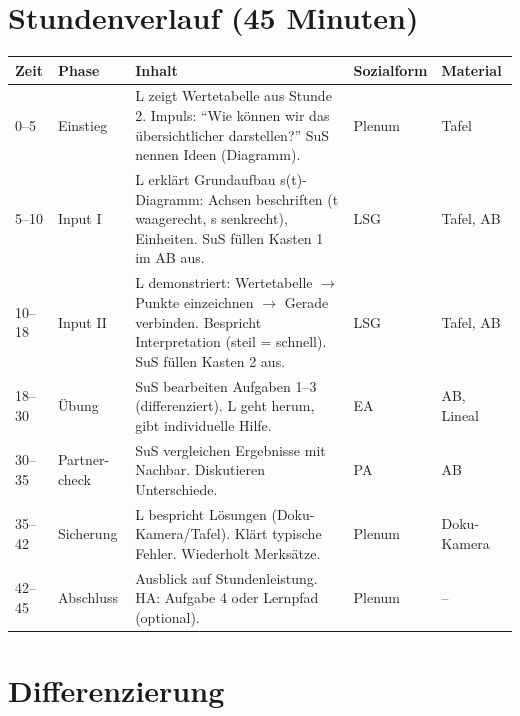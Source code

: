 \documentclass[11pt,a4paper]{article}
\begin{document}
\section*{Stundenverlauf (45 Minuten)}

\begin{longtable}{|p{1cm}|p{1.5cm}|p{6cm}|p{2.5cm}|p{2cm}|}
\hline
\textbf{Zeit} & \textbf{Phase} & \textbf{Inhalt} & \textbf{Sozialform} & \textbf{Material} \\
\hline
\endhead

0--5 & Einstieg & L zeigt Wertetabelle aus Stunde 2. Impuls: ``Wie können wir das übersichtlicher darstellen?'' SuS nennen Ideen (Diagramm). & Plenum & Tafel \\
\hline

5--10 & Input I & L erklärt Grundaufbau s(t)-Diagramm: Achsen beschriften (t waagerecht, s senkrecht), Einheiten. SuS füllen Kasten 1 im AB aus. & LSG & Tafel, AB \\
\hline

10--18 & Input II & L demonstriert: Wertetabelle $\to$ Punkte einzeichnen $\to$ Gerade verbinden. Bespricht Interpretation (steil = schnell). SuS füllen Kasten 2 aus. & LSG & Tafel, AB \\
\hline

18--30 & Übung & SuS bearbeiten Aufgaben 1--3 (differenziert). L geht herum, gibt individuelle Hilfe. & EA & AB, Lineal \\
\hline

30--35 & Partner-check & SuS vergleichen Ergebnisse mit Nachbar. Diskutieren Unterschiede. & PA & AB \\
\hline

35--42 & Sicherung & L bespricht Lösungen (Doku-Kamera/Tafel). Klärt typische Fehler. Wiederholt Merksätze. & Plenum & Doku-Kamera \\
\hline

42--45 & Abschluss & Ausblick auf Stundenleistung. HA: Aufgabe 4 oder Lernpfad (optional). & Plenum & -- \\
\hline
\end{longtable}

\section*{Differenzierung}
\end{document}
